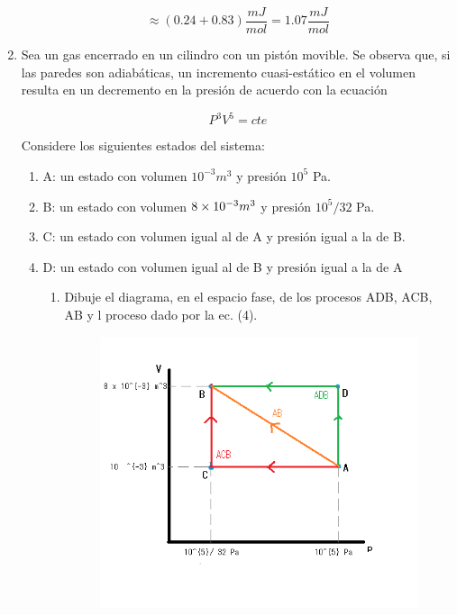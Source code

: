 \documentclass[12pt,a4paper]{article}
\begin{document}
\begin{enumerate}
    \begin{equation*}
        \approx (0.24 + 0.83) \frac{mJ}{mol} = 1.07   \frac{mJ}{mol}
    \end{equation*}
    
    
    
    
    
    
    \item Sea un gas encerrado en un cilindro con un pistón movible. Se observa que, si las paredes son adiabáticas, un incremento cuasi-estático en el volumen resulta en un decremento en la presión de acuerdo con la ecuación
    
    \begin{equation}
        P^3 V^5 = cte
    \end{equation}
    
    Considere los siguientes estados del sistema:
    
    \begin{enumerate}
        \item A: un estado con volumen $10^{-3} m^3$ y presión $10^5$ Pa.
        
        \item B: un estado con volumen $\num{8 e -3}m^3$ y presión $10^5/32$ Pa.
        
        \item C: un estado con volumen igual al de A y presión igual a la de B.
        
        \item D: un estado con volumen igual al de B y presión igual a la de A
        
        
        \begin{enumerate}
            \item Dibuje el diagrama, en el espacio fase, de los procesos ADB, ACB, AB y l proceso dado por la ec. (4).
            
            \begin{figure}[h!]
                \centering
                \includegraphics[scale = 0.8]{ACBADB.png}
            \end{figure}
            

\end{enumerate}
\end{enumerate}
\end{enumerate}
\end{document}
